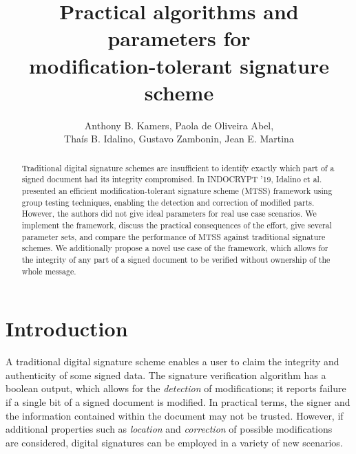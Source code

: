 \documentclass[12pt]{article}
\title{Practical algorithms and parameters for \\ modification-tolerant signature scheme}
\author{
    Anthony B. Kamers\inst{1}, Paola de Oliveira Abel\inst{1}, \\
    Thaís B. Idalino\inst{1}, Gustavo Zambonin\inst{1}, Jean E. Martina\inst{1}
}
\begin{document}
\def\floor#1{\lfloor #1 \rfloor}
\def\F{\mathbb{F}}
\def\H{\mathcal{H}}
\def\M{\mathcal{M}}
\def\dRelation{d = \floor{\frac{q-1}{k-1}}}
\def\suchThat{\, |\,}
\def\sk{\mathsf{sk}}
\def\pk{\mathsf{pk}}

\maketitle

\begin{abstract}
  Traditional digital signature schemes are insufficient to identify exactly which part of a signed document had its integrity compromised. In INDOCRYPT '19, Idalino et al. presented an efficient modification-tolerant signature scheme (MTSS) framework using group testing techniques, enabling the detection and correction of modified parts. However, the authors did not give ideal parameters for real use case scenarios. We implement the framework, discuss the practical consequences of the effort, give several parameter sets, and compare the performance of MTSS against traditional signature schemes. We additionally propose a novel use case of the framework, which allows for the integrity of any part of a signed document to be verified without ownership of the whole message.
\end{abstract}

\section{Introduction}
\label{sec:introduction}

A traditional digital signature scheme enables a user to claim the integrity and authenticity of some signed data. The signature verification algorithm has a boolean output, which allows for the \emph{detection} of modifications; it reports failure if a single bit of a signed document is modified. In practical terms, the signer and the information contained within the document may not be trusted. However, if additional properties such as \emph{location} and \emph{correction} of possible modifications~\cite{mtss-idalino-2019} are considered, digital signatures can be employed in a variety of new scenarios.
\end{document}
